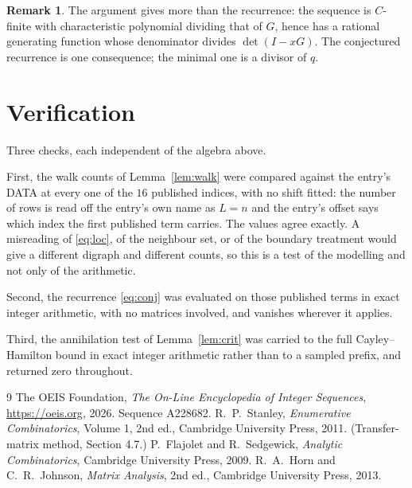\documentclass[11pt,a4paper]{article}
\theoremstyle{plain}
\theoremstyle{definition}
\newtheorem{remark}[theorem]{Remark}
\begin{document}
\begin{remark}
The argument gives more than the recurrence: the sequence is $C$-finite with characteristic
polynomial dividing that of $G$, hence has a rational generating function whose denominator
divides $\det(I-xG)$. The conjectured recurrence is one consequence; the minimal one is a
divisor of $q$.
\end{remark}

\section{Verification}

Three checks, each independent of the algebra above.

First, the walk counts of Lemma~\ref{lem:walk} were compared against the entry's DATA at
every one of the $16$ published indices, with no shift fitted: the number of rows is
read off the entry's own name as $L=n$ and the entry's offset says which index the first
published term carries. The values agree exactly. A misreading of \eqref{eq:loc}, of the
neighbour set, or of the boundary treatment would give a different digraph and different
counts, so this is a test of the modelling and not only of the arithmetic.

Second, the recurrence \eqref{eq:conj} was evaluated on those published terms in exact
integer arithmetic, with no matrices involved, and vanishes wherever it applies.

Third, the annihilation test of Lemma~\ref{lem:crit} was carried to the full
Cayley--Hamilton bound in exact integer arithmetic rather than to a sampled prefix, and
returned zero throughout.

\begin{thebibliography}{9}
 The OEIS Foundation, \emph{The On-Line Encyclopedia of Integer
Sequences}, \url{https://oeis.org}, 2026. Sequence A228682.
 R.~P.~Stanley, \emph{Enumerative Combinatorics}, Volume 1, 2nd ed.,
Cambridge University Press, 2011. (Transfer-matrix method, Section 4.7.)
 P.~Flajolet and R.~Sedgewick, \emph{Analytic Combinatorics}, Cambridge
University Press, 2009.
 R.~A.~Horn and C.~R.~Johnson, \emph{Matrix Analysis}, 2nd ed., Cambridge
University Press, 2013.
\end{thebibliography}
\end{document}
